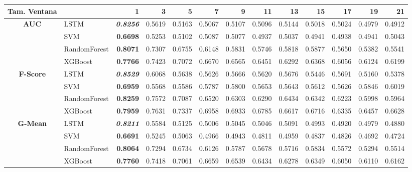 \begin{table}[H]
	\centering
	\begin{adjustbox}{max width=12cm}
		\begin{tabular}{|c|l|r|r|r|r|r|r|r|r|r|r|r|}
			\hline
			\textbf{Tam. Ventana}&         &      1  &      3  &      5  &      7  &      9  &      11 &      13 &      15 &      17 &      19 &      21 \\
			\hline
			\textbf{AUC} &  LSTM & \textit{ \textbf{  0.8256 } } &  0.5619 &  0.5163 &  0.5067 &  0.5107 &  0.5096 &  0.5144 &  0.5018 &  0.5024 &  0.4979 &  0.4912 \\
			&  SVM & \textbf{  0.6698 } &  0.5253 &  0.5102 &  0.5087 &  0.5077 &  0.4937 &  0.5037 &  0.4941 &  0.4938 &  0.4941 &  0.5043 \\
			&  RandomForest & \textbf{  0.8071 } &  0.7307 &  0.6755 &  0.6148 &  0.5831 &  0.5746 &  0.5818 &  0.5877 &  0.5650 &  0.5382 &  0.5541 \\
			&  XGBoost & \textbf{  0.7766 } &  0.7423 &  0.7072 &  0.6670 &  0.6565 &  0.6451 &  0.6292 &  0.6368 &  0.6056 &  0.6124 &  0.6199 \\
			\hline
			\textbf{F-Score} &  LSTM & \textit{ \textbf{  0.8529 } } &  0.6068 &  0.5638 &  0.5626 &  0.5666 &  0.5620 &  0.5676 &  0.5446 &  0.5691 &  0.5160 &  0.5378 \\
			&  SVM & \textbf{  0.6959 } &  0.5568 &  0.5586 &  0.5787 &  0.5800 &  0.5653 &  0.5643 &  0.5612 &  0.5626 &  0.5846 &  0.6019 \\
			&  RandomForest & \textbf{  0.8259 } &  0.7572 &  0.7087 &  0.6520 &  0.6303 &  0.6290 &  0.6434 &  0.6342 &  0.6223 &  0.5998 &  0.5964 \\
			&  XGBoost & \textbf{  0.7959 } &  0.7631 &  0.7337 &  0.6958 &  0.6933 &  0.6785 &  0.6617 &  0.6716 &  0.6335 &  0.6457 &  0.6628 \\
			\hline
			\textbf{G-Mean} &  LSTM & \textit{ \textbf{  0.8211 } } &  0.5584 &  0.5125 &  0.5006 &  0.5045 &  0.5046 &  0.5091 &  0.4993 &  0.4920 &  0.4979 &  0.4880 \\
			&  SVM & \textbf{  0.6691 } &  0.5245 &  0.5063 &  0.4966 &  0.4943 &  0.4811 &  0.4959 &  0.4837 &  0.4826 &  0.4692 &  0.4724 \\
			&  RandomForest & \textbf{  0.8064 } &  0.7294 &  0.6734 &  0.6126 &  0.5787 &  0.5678 &  0.5716 &  0.5834 &  0.5572 &  0.5294 &  0.5514 \\
			&  XGBoost & \textbf{  0.7760 } &  0.7418 &  0.7061 &  0.6659 &  0.6539 &  0.6434 &  0.6278 &  0.6349 &  0.6050 &  0.6110 &  0.6162 \\

\end{tabular}
\end{adjustbox}
\end{table}
